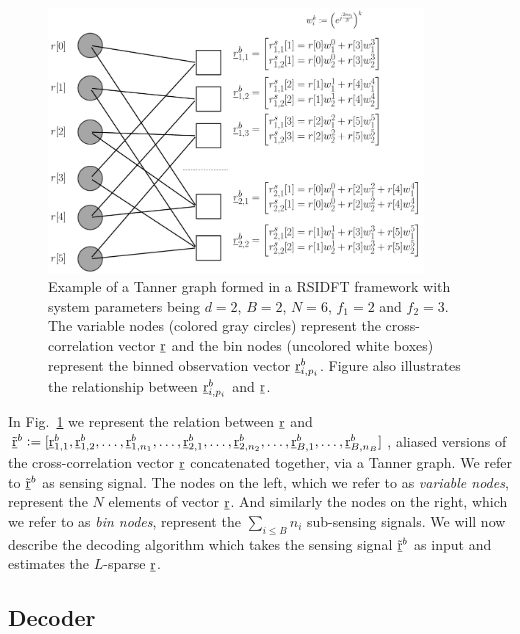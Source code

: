 \begin{enumerate}
\begin{figure}[h!]
	\begin{center}
		\includegraphics[height=7cm]{Figures/Factorgraph} 
	\end{center}	   
	\caption{Example of a Tanner graph formed in a RSIDFT framework with system parameters being $d=2$, $B=2$, $N=6$, $f_1 = 2$ and $f_2=3$. The variable nodes (colored gray circles) represent the cross-correlation vector $\underline{\mathrm{r}}$ and the bin nodes (uncolored white boxes) represent the binned observation vector $\underline{\mathrm{r}}_{i,p_i}^b$. Figure also illustrates the relationship between $\underline{\mathrm{r}}_{i,p_i}^b$ and $\underline{\mathrm{r}}$.}\label{fig:factorgraph}
	\vspace{5 pt}
\end{figure}

In Fig.~\ref{fig:factorgraph} we represent the relation between $\underline{\mathrm{r}}$ and $\tilde{\underline{\mathrm{r}}}^{b}\mathrel{\mathop:}=[\underline{\mathrm{r}}^{b}_{1,1},\underline{\mathrm{r}}^{b}_{1,2},\ldots,\underline{\mathrm{r}}^{b}_{1,n_1},\ldots, \underline{\mathrm{r}}^{b}_{2,1},\ldots,\underline{\mathrm{r}}^{b}_{2,n_2},\ldots, \underline{\mathrm{r}}^{b}_{B,1},\ldots,\underline{\mathrm{r}}^{b}_{B,n_B}]$, aliased versions of the cross-correlation vector $\underline{\mathrm{r}}$ concatenated together, via a Tanner graph. We refer to $\tilde{\underline{\mathrm{r}}}^{b}$ as sensing signal. The nodes on the left, which we refer to as {\it variable nodes}, represent the $N$ elements of vector $\underline{\mathrm{r}}$. And similarly the nodes on the right, which we refer to as {\it bin nodes}, represent the $\sum_{i\leq B} n_i$ sub-sensing signals. We will now describe the decoding algorithm which takes the sensing signal $\tilde{\underline{\mathrm{r}}}^b$ as input and estimates the $L$-sparse $\underline{\mathrm{r}}$.	 

\subsection{Decoder}		
	

\end{enumerate}
